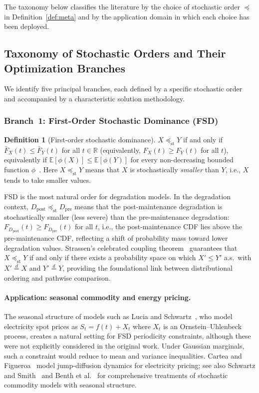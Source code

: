 \documentclass[11pt,a4paper]{article}
\theoremstyle{plain}
\theoremstyle{definition}
\newtheorem{definition}[theorem]{Definition}
\theoremstyle{remark}
\begin{document}
The taxonomy below classifies the literature by the choice of stochastic
order $\preceq$ in Definition~\ref{def:meta} and by the application
domain in which each choice has been deployed.

\subsection{Taxonomy of Stochastic Orders and Their Optimization Branches}
\label{sec:macro:branches}

We identify five principal branches, each defined by a specific
stochastic order and accompanied by a characteristic solution
methodology.

\subsubsection{Branch~1: First-Order Stochastic Dominance (FSD)}
\label{sec:macro:fsd}

\begin{definition}[First-order stochastic dominance]
\label{def:fsd}
$X \preceq_{\mathrm{st}} Y$ if and only if
$\bar{F}_X(t) \le \bar{F}_Y(t)$ for all $t \in \mathbb{R}$
(equivalently, $F_X(t) \ge F_Y(t)$ for all $t$),
equivalently if $\mathbb{E}[\phi(X)] \le
\mathbb{E}[\phi(Y)]$ for every non-decreasing bounded function
$\phi$~\cite{lehmann1955,shaked2007}.
Here $X \preceq_{\mathrm{st}} Y$ means that $X$ is stochastically
\emph{smaller} than $Y$, i.e., $X$ tends to take smaller values.
\end{definition}

FSD is the most natural order for degradation models.
In the degradation context, $D_{\mathrm{post}} \preceq_{\mathrm{st}} D_{\mathrm{pre}}$
means that the post-maintenance degradation is stochastically
smaller (less severe) than the pre-maintenance degradation:
$F_{D_{\mathrm{post}}}(t) \ge F_{D_{\mathrm{pre}}}(t)$ for all $t$, i.e., the
post-maintenance CDF lies above the pre-maintenance CDF,
reflecting a shift of probability mass toward lower degradation
values.  Strassen's celebrated coupling
theorem~\cite{strassen1965} guarantees that
$X \preceq_{\mathrm{st}} Y$ if and only if there exists a probability
space on which $X' \le Y'$ a.s.\ with $X' \stackrel{d}{=} X$ and
$Y' \stackrel{d}{=} Y$, providing the foundational link between
distributional ordering and pathwise comparison.

\paragraph{Application: seasonal commodity and energy pricing.}
The seasonal structure of models such as Lucia and
Schwartz~\cite{lucia2002}, who model electricity spot prices as
$S_t = f(t) + X_t$ where $X_t$ is an Ornstein--Uhlenbeck process,
creates a natural setting for FSD periodicity constraints, although
these were not explicitly considered in the original work.
Under Gaussian marginals, such a constraint would reduce to mean and
variance inequalities.  Cartea and
Figueroa~\cite{cartea2005} model jump-diffusion dynamics for
electricity pricing; see also Schwartz and
Smith~\cite{schwartz2000} and Benth et al.~\cite{benth2008} for
comprehensive treatments of stochastic commodity models with
seasonal structure.
\end{document}
